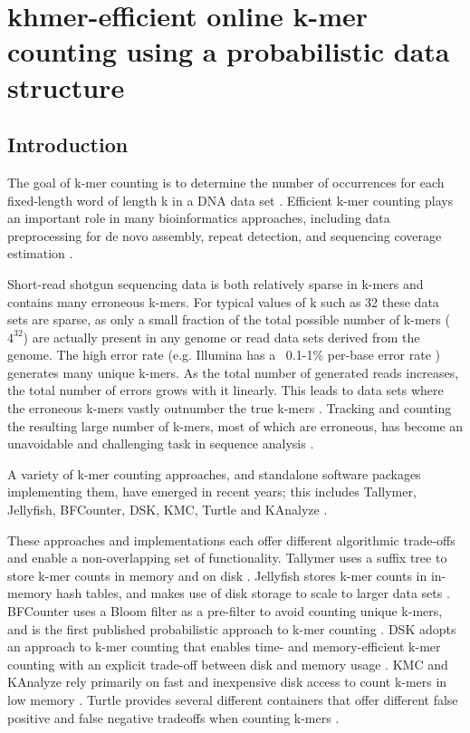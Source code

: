 \chapter{khmer-efficient online k-mer counting using a probabilistic data structure}


\section{Introduction}

The goal of k-mer counting is to determine the number of occurrences
for each fixed-length word of length k in a DNA data set
\cite{Marcais2011}. Efficient k-mer counting plays an important role
in many bioinformatics approaches, including data preprocessing for de
novo assembly, repeat detection, and sequencing coverage estimation
\cite{Kurtz2008}.


Short-read shotgun sequencing data is both relatively sparse in k-mers
and contains many erroneous k-mers.  For typical values of k such as
32 these data sets are sparse, as only a small fraction of the total
possible number of k-mers ($4^{32}$) are actually present in any
genome or read data sets derived from the genome.  The high error rate
(e.g. Illumina has a ~0.1-1\% per-base error rate
\cite{pubmed19997069}) generates many unique k-mers.  As the total
number of generated reads increases, the total number of errors grows
with it linearly. This leads to data sets where the erroneous k-mers
vastly outnumber the true k-mers \cite{Conway2011}.  Tracking and
counting the resulting large number of k-mers, most of which are
erroneous, has become an unavoidable and challenging task in sequence
analysis \cite{Minoche2011}.

A variety of k-mer counting approaches, and standalone software
packages implementing them, have emerged in recent years; this
includes Tallymer, Jellyfish, BFCounter, DSK, KMC, Turtle and KAnalyze
\cite{Kurtz2008, Marcais2011, Melsted2011, Rizk2013, Deorowicz2013,
  Roy2014, Audano2014}.

These approaches and implementations each offer different algorithmic
trade-offs and enable a non-overlapping set of functionality.
Tallymer uses a suffix tree to store k-mer counts in memory and on
disk \cite{Kurtz2008}.  Jellyfish stores k-mer counts in in-memory
hash tables, and makes use of disk storage to scale to larger data
sets \cite{Marcais2011}.  BFCounter uses a Bloom filter as a
pre-filter to avoid counting unique k-mers, and is the first published
probabilistic approach to k-mer counting \cite{Melsted2011}.  DSK
adopts an
approach to k-mer counting that enables time- and
memory-efficient k-mer counting with an explicit trade-off between
disk and memory usage \cite{Rizk2013}.  KMC and KAnalyze rely
primarily on fast and inexpensive disk access to count k-mers in low
memory \cite{Deorowicz2013,Audano2014}.  Turtle provides several
different containers that offer different false positive and false
negative tradeoffs when counting k-mers \cite{Roy2014}.

